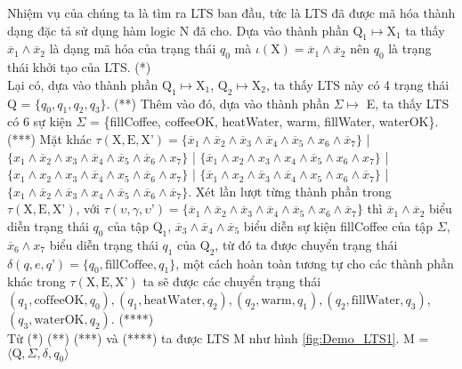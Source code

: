 \documentclass[a4paper,13pt,oneside,openany]{book}
\begin{document}
\begin{flushleft}
	Nhiệm vụ của chúng ta là tìm ra LTS ban đầu, tức là LTS đã được mã hóa thành dạng đặc tả sử dụng hàm logic N đã cho. Dựa vào thành phần $\textrm{Q}_1 \mapsto \textrm{X}_1$ ta thấy $\overline{x}_1 \land \overline{x}_2$ là dạng mã hóa của trạng thái $q_0$ mà $\iota(\textrm{X}) = \overline{x}_1 \land \overline{x}_2$ nên $q_0$ là trạng thái khởi tạo của LTS. (*)\\
	Lại có, dựa vào thành phần $\textrm{Q}_1 \mapsto \textrm{X}_1$, $\textrm{Q}_2 \mapsto \textrm{X}_2$, ta thấy LTS này có 4 trạng thái Q = $\{q_0, q_1, q_2, q_3\}$. (**) Thêm vào đó, dựa vào thành phần 
	$\Sigma \mapsto$ E, ta thấy LTS có 6 sự kiện $\Sigma$ = \{fillCoffee, coffeeOK, heatWater, warm, fillWater, waterOK\}. (***)
	Mặt khác $\tau(\textrm{X}, \textrm{E}, \textrm{X'}) = \{\overline{x}_1 \land \overline{x}_2 \land \overline{x}_3 \land \overline{x}_4 \land \overline{x}_5 \land x_6 \land \overline{x}_7 \}$ | $\{x_1 \land \overline{x}_2 \land x_3 \land \overline{x}_4 \land \overline{x}_5 \land \overline{x}_6 \land x_7 \}$ | $\{\overline{x}_1 \land x_2 \land x_3 \land x_4 \land \overline{x}_5 \land x_6 \land x_7\}$ | $\{x_1 \land x_2 \land x_3 \land \overline{x}_4 \land x_5 \land \overline{x}_6 \land x_7\}$ | $\{\overline{x}_1 \land x_2 \land \overline{x}_3 \land \overline{x}_4 \land x_5 \land x_6 \land \overline{x}_7\}$ | $\{x_1 \land \overline{x}_2 \land \overline{x}_3 \land x_4 \land \overline{x}_5 \land \overline{x}_6 \land \overline{x}_7\}$. Xét lần lượt từng thành phần trong $\tau(\textrm{X}, \textrm{E}, \textrm{X'})$, với $\tau(\upsilon, \gamma, \upsilon\textrm{'}) = \{\overline{x}_1 \land \overline{x}_2 \land \overline{x}_3 \land \overline{x}_4 \land \overline{x}_5 \land x_6 \land \overline{x}_7 \}$ thì $\overline{x}_1 \land \overline{x}_2$ biểu diễn trạng thái $q_0$ của tập $\textrm{Q}_1$, $\overline{x}_3 \land \overline{x}_4 \land \overline{x}_5$ biểu diễn sự kiện fillCoffee của tập $\Sigma$, $\overline{x}_6 \land x_7$ biểu diễn trạng thái $q_1$ của $\textrm{Q}_2$, từ đó ta được chuyển trạng thái $\delta(q, e, q\textrm{'}) = \{ q_0, \textrm{fillCoffee}, q_1 \}$, một cách hoàn toàn tương tự cho các thành phần khác trong $\tau(\textrm{X}, \textrm{E}, \textrm{X'})$ ta sẽ được các chuyển trạng thái $(q_1, \textrm{coffeeOK}, q_0), (q_1, \textrm{heatWater}, q_2), (q_2, \textrm{warm}, q_1), (q_2, \textrm{fillWater}, q_3)$, \\$(q_3, \textrm{waterOK}, q_2)$. (****)\\
	Từ (*) (**) (***) và (****) ta được LTS M như hình \ref{fig:Demo_LTS1}. M = $\langle\textrm{Q}, \Sigma, \delta, q_0\rangle$\\

\end{flushleft}
\end{document}
